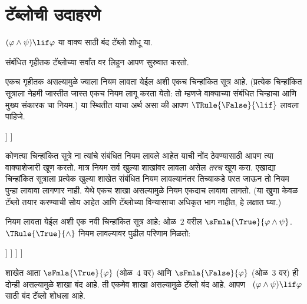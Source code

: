\section{टॅब्लोची उदाहरणे}\label{fol:tab:pro:sec}

\begin{ex}
$(\varphi \land \psi) \lif \varphi$ या वाक्य साठी बंद टॅब्लो शोधू या.

संबंधित गृहीतक टॅब्लोच्या सर्वांत वर लिहून आपण सुरुवात करतो.
\begin{oltableau}
  [\sFmla{\False}{(\varphi \land \psi) \lif \varphi},
    just = \TAss]
\end{oltableau}

एकच गृहीतक असल्यामुळे ज्याला नियम लावता येईल अशी एकच चिन्हांकित सूत्र
आहे. (प्रत्येक चिन्हांकित सूत्राला नेहमी जास्तीत जास्त एकच नियम लागू
करता येतो: तो म्हणजे वाक्याच्या संबंधित चिन्हाचा आणि
मुख्य संकारक चा नियम.) या स्थितीत याचा अर्थ असा की आपण
$\TRule{\False}{\lif}$ लावला पाहिजे.
\begin{oltableau}
  [\sFmla{\False}{(\varphi \land \psi) \lif \varphi},
    checked, just = \TAss
    [\sFmla{\True}{\varphi \land \psi},
      just={\TRule{\False}{\lif}[1]}
      [\sFmla{\False}{\varphi}, just={\TRule{\False}{\lif}[1]}]
    ]
  ]
\end{oltableau}
कोणत्या चिन्हांकित सूत्रे ना त्यांचे संबंधित नियम लावले आहेत याची नोंद
ठेवण्यासाठी आपण त्या वाक्याशेजारी खूण करतो. मात्र नियम सर्व खुल्या शाखांवर
लावला असेल \emph{तरच} खूण करा. एखाद्या चिन्हांकित सूत्राला प्रत्येक
खुल्या शाखेत संबंधित नियम लावल्यानंतर तिच्याकडे परत जाऊन तो नियम पुन्हा
लावावा लागणार नाही. येथे एकच शाखा असल्यामुळे नियम एकदाच लावावा लागतो.
(या खुणा केवळ टॅब्लो तयार करण्याची सोय आहेत आणि टॅब्लोच्या विन्यासाचा
अधिकृत भाग नाहीत, हे लक्षात घ्या.)

नियम लावता येईल अशी एक नवी चिन्हांकित सूत्र आहे: ओळ~$2$ वरील
$\sFmla{\True}{\varphi \land \psi}$. $\TRule{\True}{\land}$ नियम लावल्यावर
पुढील परिणाम मिळतो:
\begin{oltableau}
  [\sFmla{\False}{(\varphi \land \psi) \lif \varphi},
    checked, just = \TAss
    [\sFmla{\True}{\varphi \land \psi},
      just={\TRule{\False}{\lif}[1]}, checked
      [\sFmla{\False}{\varphi}, just={\TRule{\False}{\lif}[1]}
        [\sFmla{\True}{\varphi}, just={\TRule{\True}{\land}[2]}
          [\sFmla{\True}{\psi}, just={\TRule{\True}{\land}[2]}, close
          ]
        ]
      ]
    ]
  ]
\end{oltableau}
शाखेत आता $\sFmla{\True}{\varphi}$ (ओळ~$4$ वर) आणि
$\sFmla{\False}{\varphi}$ (ओळ~$3$ वर) ही दोन्ही असल्यामुळे शाखा बंद आहे.
ती एकमेव शाखा असल्यामुळे टॅब्लो बंद आहे. आपण
~$(\varphi \land \psi) \lif \varphi$ साठी बंद टॅब्लो शोधला आहे.
\end{ex}

